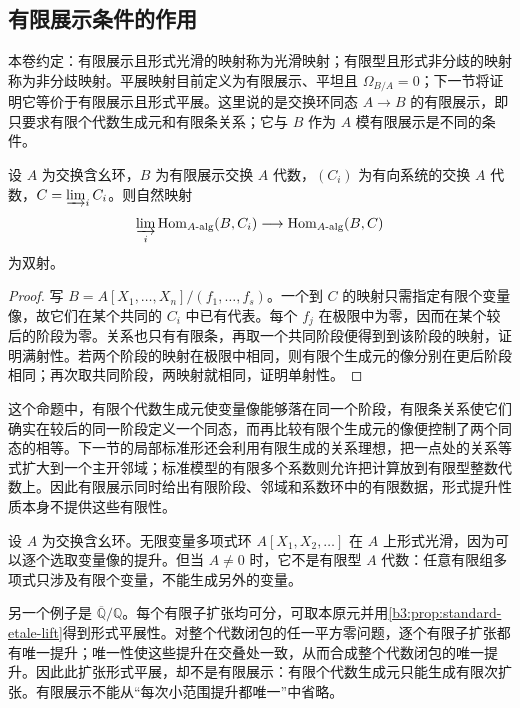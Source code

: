 \subsection{有限展示条件的作用}
\label{b3:subsec:2302:03}

本卷约定：有限展示且形式光滑的映射称为光滑映射；有限型且形式非分歧的映射称为非分歧映射。平展映射目前定义为有限展示、平坦且 \(\Omega_{B/A}=0\)；下一节将证明它等价于有限展示且形式平展。这里说的是交换环同态 \(A\to B\) 的有限展示，即只要求有限个代数生成元和有限条关系；它与 \(B\) 作为 \(A\) 模有限展示是不同的条件。

\begin{proposition}\label{b3:prop:finite-presentation-filtered-maps}
	设 \(A\) 为交换含幺环，\(B\) 为有限展示交换 \(A\) 代数，\((C_i)\) 为有向系统的交换 \(A\) 代数，\(C=\varinjlim_i C_i\)。则自然映射
	\[
		\varinjlim_i\operatorname{Hom}_{A\text{-alg}}(B,C_i) \longrightarrow\operatorname{Hom}_{A\text{-alg}}(B,C)
	\]
	为双射。
\end{proposition}
\begin{proof}
	写 \(B=A[X_1,\ldots,X_n]/(f_1,\ldots,f_s)\)。一个到 \(C\) 的映射只需指定有限个变量像，故它们在某个共同的 \(C_i\) 中已有代表。每个 \(f_j\) 在极限中为零，因而在某个较后的阶段为零。关系也只有有限条，再取一个共同阶段便得到到该阶段的映射，证明满射性。若两个阶段的映射在极限中相同，则有限个生成元的像分别在更后阶段相同；再次取共同阶段，两映射就相同，证明单射性。
\end{proof}

这个命题中，有限个代数生成元使变量像能够落在同一个阶段，有限条关系使它们确实在较后的同一阶段定义一个同态，而再比较有限个生成元的像便控制了两个同态的相等。下一节的局部标准形还会利用有限生成的关系理想，把一点处的关系等式扩大到一个主开邻域；标准模型的有限多个系数则允许把计算放到有限型整数代数上。因此有限展示同时给出有限阶段、邻域和系数环中的有限数据，形式提升性质本身不提供这些有限性。

\begin{example}\label{b3:exm:formal-without-finite-presentation}
	设 \(A\) 为交换含幺环。无限变量多项式环 \(A[X_1,X_2,\ldots]\) 在 \(A\) 上形式光滑，因为可以逐个选取变量像的提升。但当 \(A\ne0\) 时，它不是有限型 \(A\) 代数：任意有限组多项式只涉及有限个变量，不能生成另外的变量。

	\ProseParagraphBreak
	另一个例子是 \(\overline{\mathbb Q}/\mathbb Q\)。每个有限子扩张均可分，可取本原元并用\cref{b3:prop:standard-etale-lift}得到形式平展性。对整个代数闭包的任一平方零问题，逐个有限子扩张都有唯一提升；唯一性使这些提升在交叠处一致，从而合成整个代数闭包的唯一提升。因此此扩张形式平展，却不是有限展示：有限个代数生成元只能生成有限次扩张。有限展示不能从“每次小范围提升都唯一”中省略。
\end{example}

